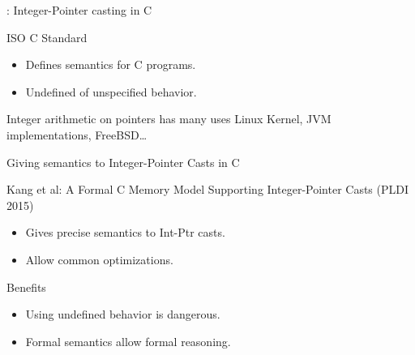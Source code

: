 \begin{frame}[fragile]{\secname : Integer-Pointer casting in C}

  \begin{minipage}{0.48\textwidth}
    
  \end{minipage}
  \begin{minipage}{0.48\textwidth}
  \begin{alertblock}{ISO C Standard}
    \begin{itemize}
    \item Defines semantics for C programs.
    \item Undefined of unspecified behavior.
    \end{itemize}
  \end{alertblock}
  \end{minipage}
  \vfill
  \begin{exampleblock}{Integer arithmetic on pointers has many uses}
    Linux Kernel, JVM implementations, FreeBSD\dots
  \end{exampleblock}
  
\end{frame}

\begin{frame}{Giving semantics to Integer-Pointer Casts in C}

  \begin{block}{Kang et al: A Formal C Memory Model Supporting Integer-Pointer Casts (PLDI 2015)}
    \begin{itemize}
    \item Gives precise semantics to Int-Ptr casts.
    \item Allow common optimizations.
    \end{itemize}
  \end{block}
  \vfill
  \begin{exampleblock}{Benefits}
    \begin{itemize}
    \item Using undefined behavior is dangerous.
    \item Formal semantics allow formal reasoning.
    \end{itemize}
  \end{exampleblock}


\end{frame}



